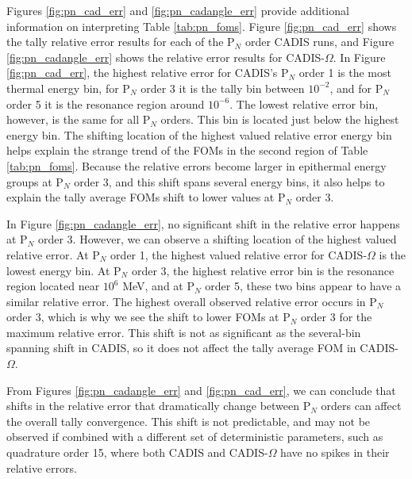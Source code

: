 Figures \ref{fig:pn_cad_err} and \ref{fig:pn_cadangle_err} provide additional
information on interpreting Table \ref{tab:pn_foms}. Figure \ref{fig:pn_cad_err}
shows the tally relative error results for each of the P$_N$ order CADIS runs,
and Figure
\ref{fig:pn_cadangle_err} shows the relative error results
for CADIS-$\Omega$. In Figure
\ref{fig:pn_cad_err}, the highest relative error for CADIS's
P$_N$ order 1 is the most thermal energy bin, for P$_N$ order 3 it is the tally bin
between $10^{-2}$, and for P$_N$ order 5 it is the resonance region around
$10^{-6}$. The lowest relative error bin, however, is the same for all P$_N$
orders. This bin is located just below the highest energy bin. The shifting
location of the highest valued relative error energy bin helps explain the
strange trend of the FOMs in the second region of Table \ref{tab:pn_foms}.
Because the relative errors become larger in epithermal
energy groups at P$_N$ order 3, and this shift spans several energy bins, it
also helps to explain the tally average FOMs shift to lower values at P$_N$
order 3.

In Figure \ref{fig:pn_cadangle_err}, no significant shift in the relative error
happens at P$_N$ order 3. However, we can observe a shifting location of the highest
valued relative error. At P$_N$ order 1, the highest valued relative error for
CADIS-$\Omega$ is the lowest energy bin. At P$_N$ order 3, the highest relative
error bin is the resonance region located near $10^{6}$ MeV,  and at P$_N$ order
5, these two bins appear to have a similar relative error. The highest overall
observed relative error occurs in P$_N$ order 3, which is why we see the shift
to lower FOMs at P$_N$ order 3 for the maximum relative error. 
This shift is not as significant as the several-bin
spanning shift in CADIS, so it does not affect the tally average FOM in
CADIS-$\Omega$.

From Figures \ref{fig:pn_cadangle_err} and \ref{fig:pn_cad_err}, we can conclude
that shifts in the relative error that dramatically change between P$_N$ orders
can affect the overall tally convergence. This shift is not predictable, and may
not be observed if combined with a different set of deterministic parameters,
such as quadrature order 15, where both CADIS and CADIS-$\Omega$ have no spikes
in their relative errors.


